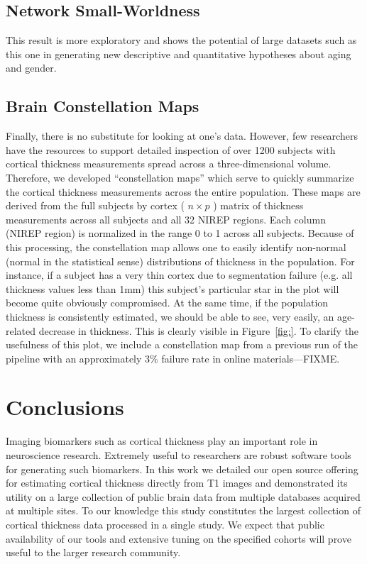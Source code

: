 \subsection{Network Small-Worldness}
This result is more exploratory and shows the potential of large
datasets such as this one in generating new descriptive and
quantitative hypotheses about aging and gender.  

\subsection{Brain Constellation Maps}
Finally, there is no substitute for looking at one's data.  However,
few researchers have the resources to support detailed 
inspection of over 1200 subjects with cortical thickness
measurements spread across a three-dimensional volume.  Therefore, we
developed ``constellation maps'' which serve to quickly summarize the
cortical thickness measurements across the entire population.   These
maps are derived from the full subjects by cortex ( $n \times p$ ) matrix of thickness measurements
across all subjects and all 32 NIREP regions.  Each column (NIREP
region) is normalized in the range 0 to 1 across all subjects.
Because of this processing, the constellation map allows one to
easily identify non-normal (normal in the statistical sense)
distributions of thickness in the population.  For instance, if a
subject has a very thin cortex due to segmentation failure (e.g. all
thickness values less than 1mm) this subject's particular star
in the plot will become quite obviously compromised.  At the same
time, if the population thickness is consistently estimated, we should
be able to see, very easily, an age-related decrease in thickness.
This is clearly visible in Figure~\ref{fig:}.  To clarify the
usefulness of this plot, we include a constellation map from a
previous run of the pipeline with an approximately 3\% failure rate in
online materials---FIXME. 

\section{Conclusions}

Imaging biomarkers such as cortical thickness play an 
important role in neuroscience research.  Extremely useful to
researchers are robust software tools for generating such 
biomarkers.  In this work we detailed our open source offering for estimating
cortical thickness directly from T1 images and demonstrated
its utility on a large collection of public brain data from
multiple databases acquired at multiple sites.  To our knowledge
this study constitutes the largest collection of cortical
thickness data processed in a single study.  
We expect that public availability of our tools and extensive tuning on 
the specified cohorts will prove useful to the larger
research community.  

